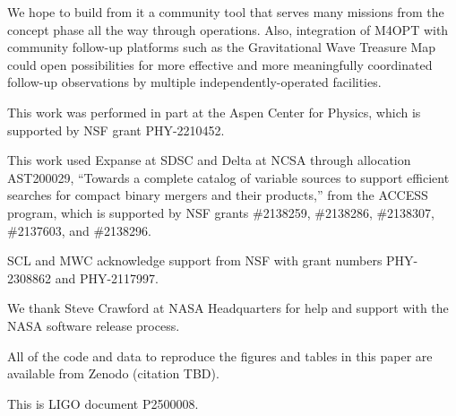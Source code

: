\documentclass[twocolumn,times]{aastex631}
\begin{document}
We hope to build from it a community tool that serves many missions from the concept phase all the way through operations. Also, integration of \ac{M4OPT} with community follow-up platforms such as the Gravitational Wave Treasure Map \citep{2020ApJ...894..127W} could open possibilities for more effective and more meaningfully coordinated follow-up observations by multiple independently-operated facilities.

\begin{acknowledgments}
This work was performed in part at the Aspen Center for Physics, which is supported by \ac{NSF} grant PHY-2210452.

This work used Expanse at \ac{SDSC} and Delta at \ac{NCSA} through allocation AST200029, ``Towards a complete catalog of variable sources to support efficient searches for compact binary mergers and their products,'' from the \ac{ACCESS} program, which is supported by \ac{NSF} grants \#2138259, \#2138286, \#2138307, \#2137603, and \#2138296.

SCL and MWC acknowledge support from \ac{NSF} with grant numbers PHY-2308862 and PHY-2117997.

We thank Steve Crawford at NASA Headquarters for help and support with the NASA software release process.

All of the code and data to reproduce the figures and tables in this paper are available from Zenodo (citation TBD).

This is LIGO document P2500008.
\end{acknowledgments}

\vspace{5mm}

{}

\end{document}
